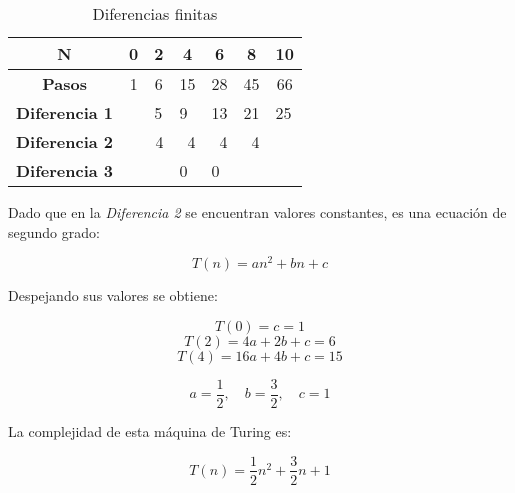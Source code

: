 \documentclass{uc3mpracticas}
\begin{document}
\begin{table}[!h]
  \centering
\begin{tabular}{|c|p{1cm}|p{1cm}|p{1cm}|p{1cm}|p{1cm}|p{1cm}|}
\hline
\textbf{N}     & \multicolumn{1}{c|}{\textbf{0}} & \multicolumn{1}{c|}{\textbf{2}} & \multicolumn{1}{c|}{\textbf{4}} & \multicolumn{1}{c|}{\textbf{6}} & \multicolumn{1}{c|}{\textbf{8}} & \multicolumn{1}{c|}{\textbf{10}} \\ \hline
\textbf{Pasos} & \multicolumn{1}{c|}{1}          & \multicolumn{1}{c|}{6}          & \multicolumn{1}{c|}{15}         & \multicolumn{1}{c|}{28}         & \multicolumn{1}{c|}{45}         & \multicolumn{1}{c|}{66}          \\ \hline
\textbf{Diferencia 1}                  &                                                         & 5                                                       & 9                               & 13                              & 21                              & 25                               \\ \hline
\textbf{Diferencia 2}                  &                                                         & \multicolumn{1}{r|}{4}                                  & \multicolumn{1}{r|}{4}          & \multicolumn{1}{r|}{4}          & \multicolumn{1}{r|}{4}          &                                  \\ \hline
\textbf{Diferencia 3}                  &                                                         &                                                         & 0                               & 0                               &                                 &                                  \\ \hline
\end{tabular}
\caption{Diferencias finitas}
\end{table}


  Dado que en la \textit{Diferencia 2} se encuentran valores constantes, es una ecuación de segundo grado:

  $$ T(n) = an^2 + bn + c $$

  Despejando sus valores se obtiene:

  $$ T(0) = c = 1 $$
  $$ T(2) = 4a + 2b + c = 6 $$
  $$ T(4) = 16a + 4b + c = 15 $$

  $$ a = \frac{1}{2} ,\quad b = \frac{3}{2} ,\quad c = 1 $$

  La complejidad de esta máquina de Turing es:

  $$ T(n) = \frac{1}{2}n^2 + \frac{3}{2}n + 1 $$
\end{document}
